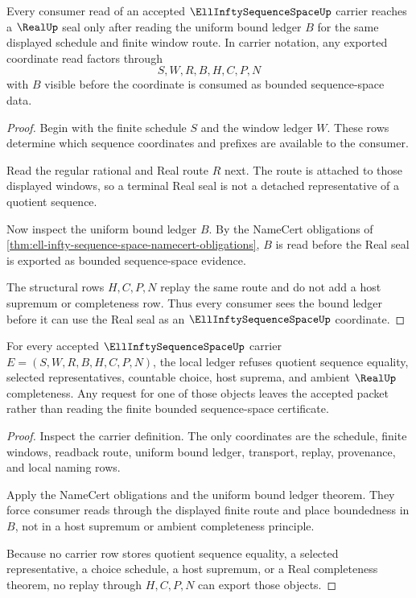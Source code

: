 \begin{theorem}
\label{thm:ell-infty-sequence-space-uniform-bound-ledger}
Every consumer read of an accepted $\EllInftySequenceSpaceUp$ carrier reaches a $\RealUp$ seal only after reading the uniform bound ledger $B$ for the same displayed schedule and finite window route. In carrier notation, any exported coordinate read factors through
$$
S,W,R,B,H,C,P,N
$$
with $B$ visible before the coordinate is consumed as bounded sequence-space data.
\end{theorem}
\begin{proof}
Begin with the finite schedule $S$ and the window ledger $W$. These rows determine which sequence coordinates and prefixes are available to the consumer.

Read the regular rational and Real route $R$ next. The route is attached to those displayed windows, so a terminal Real seal is not a detached representative of a quotient sequence.

Now inspect the uniform bound ledger $B$. By the NameCert obligations of \autoref{thm:ell-infty-sequence-space-namecert-obligations}, $B$ is read before the Real seal is exported as bounded sequence-space evidence.

The structural rows $H,C,P,N$ replay the same route and do not add a host supremum or completeness row. Thus every consumer sees the bound ledger before it can use the Real seal as an $\EllInftySequenceSpaceUp$ coordinate.
\end{proof}

\begin{theorem}
\label{thm:ell-infty-sequence-space-l10-nonescape}
For every accepted $\EllInftySequenceSpaceUp$ carrier $E=(S,W,R,B,H,C,P,N)$, the local ledger refuses quotient sequence equality, selected representatives, countable choice, host suprema, and ambient $\RealUp$ completeness. Any request for one of those objects leaves the accepted packet rather than reading the finite bounded sequence-space certificate.
\end{theorem}
\begin{proof}
Inspect the carrier definition. The only coordinates are the schedule, finite windows, readback route, uniform bound ledger, transport, replay, provenance, and local naming rows.

Apply the NameCert obligations and the uniform bound ledger theorem. They force consumer reads through the displayed finite route and place boundedness in $B$, not in a host supremum or ambient completeness principle.

Because no carrier row stores quotient sequence equality, a selected representative, a choice schedule, a host supremum, or a Real completeness theorem, no replay through $H,C,P,N$ can export those objects.
\end{proof}


